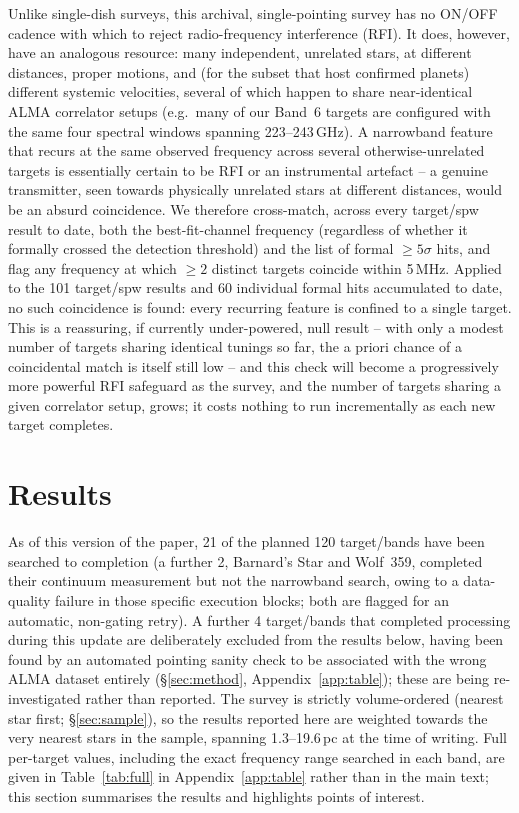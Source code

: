\documentclass{openjournal}
\begin{document}
Unlike single-dish surveys, this archival, single-pointing survey has no
ON/OFF cadence with which to reject radio-frequency interference (RFI).
It does, however, have an analogous resource: many independent,
unrelated stars, at different distances, proper motions, and (for the
subset that host confirmed planets) different systemic velocities,
several of which happen to share near-identical ALMA correlator setups
(e.g.\ many of our Band~6 targets are configured with the same four
spectral windows spanning 223--243\,GHz). A narrowband feature that
recurs at the same observed frequency across several otherwise-unrelated
targets is essentially certain to be RFI or an instrumental artefact --
a genuine transmitter, seen towards physically unrelated stars at
different distances, would be an absurd coincidence. We therefore
cross-match, across every target/spw result to date, both the
best-fit-channel frequency (regardless of whether it formally crossed
the detection threshold) and the list of formal $\geq5\sigma$ hits, and
flag any frequency at which $\geq2$ distinct targets coincide within
5\,MHz. Applied to the 101 target/spw results and 60 individual formal
hits accumulated to date, no such coincidence is found: every recurring
feature is confined to a single target. This is a reassuring, if
currently under-powered, null result -- with only a modest number of
targets sharing identical tunings so far, the a priori chance of a
coincidental match is itself still low -- and this check will become a
progressively more powerful RFI safeguard as the survey, and the number
of targets sharing a given correlator setup, grows; it costs nothing to
run incrementally as each new target completes.

\section{Results}
\label{sec:results}

As of this version of the paper, 21 of the planned 120 target/bands have
been searched to completion (a further 2, Barnard's Star and Wolf~359,
completed their continuum measurement but not the narrowband search,
owing to a data-quality failure in those specific execution blocks; both
are flagged for an automatic, non-gating retry). A further 4 target/bands
that completed processing during this update are deliberately excluded
from the results below, having been found by an automated pointing sanity
check to be associated with the wrong ALMA dataset entirely
(\S\ref{sec:method}, Appendix~\ref{app:table}); these are being
re-investigated rather than reported. The survey is strictly
volume-ordered (nearest star first; \S\ref{sec:sample}), so the results
reported here are weighted towards the very nearest stars in the sample,
spanning 1.3--19.6\,pc at the time of writing. Full per-target values,
including the exact frequency range searched in each band, are given in
Table~\ref{tab:full} in Appendix~\ref{app:table} rather than in the main
text; this section summarises the results and highlights points of
interest.
\end{document}
